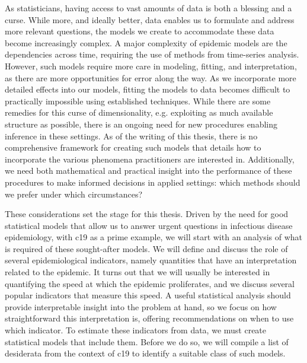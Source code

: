 %

As statisticians, having access to vast amounts of data is both a blessing and a curse. While more, and ideally better, data enables us to formulate and address more relevant questions, the models we create to accommodate these data become increasingly complex. A major complexity of epidemic models are the dependencies across time, requiring the use of methods from time-series analysis. However, such models require more care in modeling, fitting, and interpretation, as there are more opportunities for error along the way. As we incorporate more detailed effects into our models, fitting the models to data becomes difficult to practically impossible using established techniques. While there are some remedies for this curse of dimensionality, e.g. exploiting as much available structure as possible, there is an ongoing need for new procedures enabling inference in these settings. As of the writing of this thesis, there is no comprehensive framework for creating such models that details how to incorporate the various phenomena practitioners are interested in. Additionally, we need both mathematical and practical insight into the performance of these procedures to make informed decisions in applied settings: which methods should we prefer under which circumstances?

These considerations set the stage for this thesis. Driven by the need for good statistical models that allow us to answer urgent questions in infectious disease epidemiology, with \acrshort{c19} as a prime example, we will start with an analysis of what is required of these sought-after models. We will define and discuss the role of several epidemiological indicators, namely quantities that have an interpretation related to the epidemic. It turns out that we will usually be interested in quantifying the speed at which the epidemic proliferates, and we discuss several popular indicators that measure this speed. A useful statistical analysis should provide interpretable insight into the problem at hand, so we focus on how straightforward this interpretation is, offering recommendations on when to use which indicator. To estimate these indicators from data, we must create statistical models that include them. Before we do so, we will compile a list of desiderata from the context of \acrshort{c19} to identify a suitable class of such models. 

